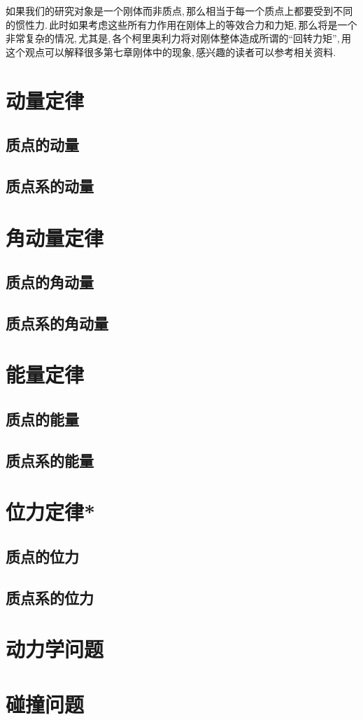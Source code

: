 如果我们的研究对象是一个刚体而非质点,\,那么相当于每一个质点上都要受到不同的惯性力.\,此时如果考虑这些所有力作用在刚体上的等效合力和力矩,\,那么将是一个非常复杂的情况,\,尤其是,\,各个柯里奥利力将对刚体整体造成所谓的``回转力矩'',\,用这个观点可以解释很多第七章刚体中的现象,\,感兴趣的读者可以参考相关资料.

\section{动量定律}

\subsection{质点的动量}

\subsection{质点系的动量}


\section{角动量定律}

\subsection{质点的角动量}

\subsection{质点系的角动量}


\section{能量定律}

\subsection{质点的能量}

\subsection{质点系的能量}


\section{位力定律*}

\subsection{质点的位力}

\subsection{质点系的位力}



\section{动力学问题}

\section{碰撞问题}

